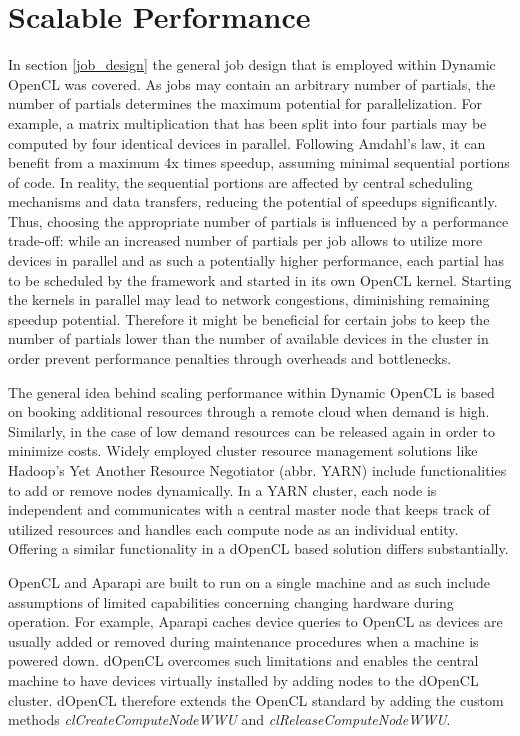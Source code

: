 \section{Scalable Performance}
\label{scalable_performance}

In section \ref{job_design} the general job design that is employed within Dynamic OpenCL was covered. As jobs may contain an arbitrary number of partials, the number of partials determines the maximum potential for parallelization. For example, a matrix multiplication that has been split into four partials may be computed by four identical devices in parallel. Following Amdahl's law, it can benefit from a maximum 4x times speedup\cite{amdahl}, assuming minimal sequential portions of code. In reality, the sequential portions are affected by central scheduling mechanisms and data transfers, reducing the potential of speedups significantly. Thus, choosing the appropriate number of partials is influenced by a performance trade-off: while an increased number of partials per job allows to utilize more devices in parallel and as such a potentially higher performance, each partial has to be scheduled by the framework and started in its own OpenCL kernel. Starting the kernels in parallel may lead to network congestions, diminishing remaining speedup potential. Therefore it might be beneficial for certain jobs to keep the number of partials lower than the number of available devices in the cluster in order prevent performance penalties through overheads and bottlenecks.

The general idea behind scaling performance within Dynamic OpenCL is based on booking additional resources through a remote cloud when demand is high. Similarly, in the case of low demand resources can be released again in order to minimize costs. Widely employed cluster resource management solutions like Hadoop's Yet Another Resource Negotiator (abbr. YARN) include functionalities to add or remove nodes dynamically. In a YARN cluster, each node is independent and communicates with a central master node that keeps track of utilized resources and handles each compute node as an individual entity. Offering a similar functionality in a dOpenCL based solution differs substantially.

OpenCL and Aparapi are built to run on a single machine and as such include assumptions of limited capabilities concerning changing hardware during operation. For example, Aparapi caches device queries to OpenCL as devices are usually added or removed during maintenance procedures when a machine is powered down. dOpenCL overcomes such limitations and enables the central machine to have devices virtually installed by adding nodes to the dOpenCL cluster. dOpenCL therefore extends the OpenCL standard by adding the custom methods \textit{clCreateComputeNodeWWU} and \textit{clReleaseComputeNodeWWU}.

